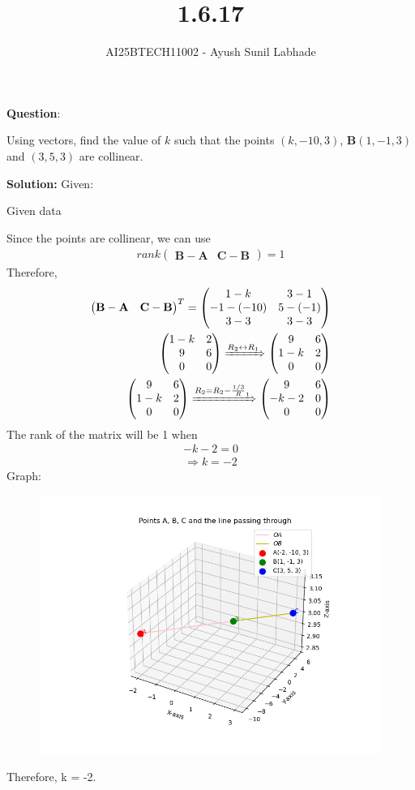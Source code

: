 \documentclass{beamer}
\title{1.6.17}
\author{AI25BTECH11002 - Ayush Sunil Labhade}
\theoremstyle{remark}
\newcommand{\myvec}[1]{\ensuremath{\begin{pmatrix}#1\end{pmatrix}}}
\let\vec\mathbf
\numberwithin{equation}{section}
\begin{document}
\maketitle
		\textbf{Question}:\newline

		Using vectors, find the value of $k$ such that the points $(k , -10, 3)$, $\vec{B}(1, -1, 3)$ and $(3, 5, 3)$ are collinear.

		\textbf{Solution:}
		Given:
		\begin{table}[H]
			\centering
			
			\label{}
			\caption{Given data}
		\end{table}
		Since the points are collinear, we can use 
		\begin{align}
			rank\myvec{\vec{B}-\vec{A} & \vec{C}-\vec{B}} = 1	
		\end{align}
		Therefore,
		\begin{align}
			\myvec{\vec{B}-\vec{A} & \vec{C}-\vec{B}}^T = \myvec{1-k & 3-1\\-1-(-10) & 5-(-1)\\3-3 & 3-3}	
			\\
			\myvec{1-k & 2\\9 & 6\\0 & 0}
			\xRightarrow[]{R_2 \leftrightarrow R_1} 
			\myvec{9 & 6 \\1-k & 2\\0 & 0} 
			\\
			\myvec{9 & 6\\1-k & 2\\0 & 0}
			\xRightarrow[]{R_2= R_2-\frac{1/3}R_1} 
			\myvec{9 & 6\\ -k-2 & 0 \\ 0 & 0} 
		\end{align}
		The rank of the matrix will be 1 when 
		\begin{align}
		-k-2 = 0
		\end{align}
		\begin{align}
		\Rightarrow k = -2
		\end{align}
		Graph:
\begin{figure}[H]
	\centering
	\includegraphics[scale=0.5]{plot}
	\caption*{}
	\label{fig}
\end{figure}
Therefore, k = -2.
\end{document}
